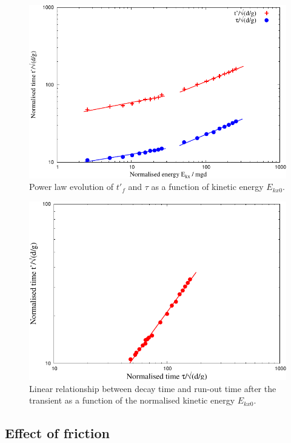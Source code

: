 \begin{figure}[tbhp]
\centering
\includegraphics[width=\textwidth]{tp_tau_mgd}
\caption{Power law evolution of $t'_f$ and $\tau$ as a function of kinetic 
energy $E_{kx0}$.}
\label{fig:tp_tau_mgd}
\end{figure}


\begin{figure}[tbhp]
\centering
\includegraphics[width=\textwidth]{tpTau}
\caption{Linear relationship between decay time and run-out time after the 
transient as a function of the normalised kinetic energy $E_{kx0}$.}
\label{fig:tpTau}
\end{figure}



\subsection{Effect of friction}
\label{sec:parameters}

